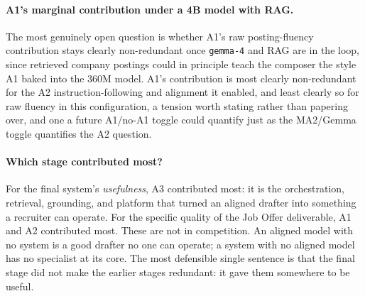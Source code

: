 \paragraph{A1's marginal contribution under a 4B model with RAG.}
The most genuinely open question is whether A1's raw posting-fluency contribution stays
clearly non-redundant once \verb|gemma-4| and RAG are in the loop, since retrieved company
postings could in principle teach the composer the style A1 baked into the 360M model. A1's
contribution is most clearly non-redundant for the A2 instruction-following and alignment it
enabled, and least clearly so for raw fluency in this configuration, a tension worth stating
rather than papering over, and one a future A1/no-A1 toggle could quantify just as the
MA2/Gemma toggle quantifies the A2 question.

\paragraph{Which stage contributed most?}
For the final system's \emph{usefulness}, A3 contributed most: it is the orchestration,
retrieval, grounding, and platform that turned an aligned drafter into something a recruiter
can operate. For the specific quality of the Job Offer deliverable, A1 and A2 contributed
most. These are not in competition. An aligned model with no system is a good drafter no one
can operate; a system with no aligned model has no specialist at its core. The most
defensible single sentence is that the final stage did not make the earlier stages
redundant: it gave them somewhere to be useful.
